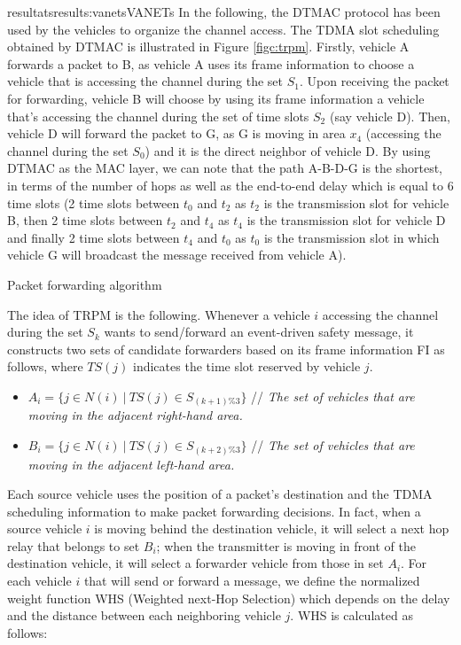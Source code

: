 \documentclass{ra2016}
\begin{document}
\begin{module}{resultats}{results:vanets}{VANETs}
In the following, the DTMAC protocol has been used by the vehicles to organize the channel access. The TDMA slot 
scheduling obtained by DTMAC is illustrated in Figure \ref{figc:trpm}. Firstly, vehicle A forwards a packet to B, as  vehicle A uses its frame 
information to choose a vehicle that is accessing the channel during the set $S_1$. Upon receiving the packet for forwarding, vehicle B 
will choose by using its frame information a vehicle that's accessing the channel during the set of time slots $S_2$ 
(say vehicle D). Then, vehicle D will forward the packet to G, as G is moving in area $x_4$ (accessing the channel during the 
set $S_0$) and it is the direct neighbor of vehicle D. By using DTMAC as the MAC layer, we can note that the path A-B-D-G is 
the shortest, in terms of the number of hops as well as the end-to-end delay which  is equal to 6 time slots  (2 time slots 
between $t_0$ and $t_2$ as $t_2$ is the transmission slot for vehicle B, then 2 time slots between $t_2$ and $t_4$ as $t_4$ is the 
transmission slot for vehicle D and finally 2 time slots between $t_4$ and $t_0$ as $t_0$ is the transmission slot in which vehicle 
G will broadcast the message received from  vehicle A). 

Packet forwarding algorithm

The idea of TRPM is the following. Whenever a vehicle $i$ accessing the channel during the set $S_k$ wants to send/forward an 
event-driven safety message, it constructs two sets of candidate forwarders based on its frame information FI as 
follows, where $TS(j)$ indicates the time slot reserved by vehicle $j$.

\begin{itemize}
	\item $A_i=\{j\in N(i)~|~TS(j)\in S_{(k+1)\%3}\}$ // \textit{The set of vehicles that are moving in the adjacent right-hand 
	area.}
	\item $B_i=\{j\in N(i)~|~TS(j)\in S_{(k+2)\%3}\}$ // \textit{The set of vehicles that are moving in the adjacent 
	left-hand area.}
\end{itemize}

Each source vehicle uses the position of a packet's destination and the TDMA scheduling information to make packet forwarding 
decisions. In fact, when a source vehicle $i$ is moving behind the destination vehicle, it will select a next hop relay that 
belongs to set $B_i$; when the transmitter is moving in front of the destination vehicle, it will select a forwarder vehicle 
from those in  set $A_i$. %
For each vehicle $i$ that will send or forward a message, we define the normalized weight function WHS (Weighted next-Hop 
Selection) which depends on the delay and the distance between each neighboring vehicle $j$. WHS is calculated as follows:


\end{module}
\end{document}
